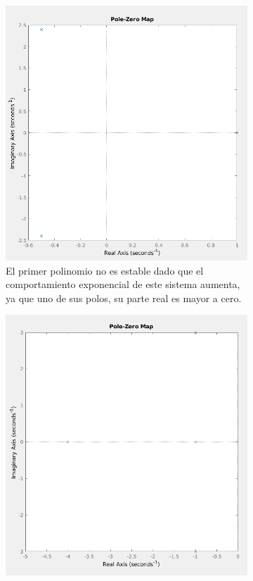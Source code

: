 \documentclass[12pt, letterpaper]{article}
\begin{document}
\begin{enumerate}
				\begin{figure}[H]
					\centering
					\begin{subfigure}[b]{0.49\linewidth}
						\includegraphics[width=\linewidth]{3a.png}
						\caption{El primer polinomio no es estable dado que el comportamiento exponencial de este sistema aumenta, ya que uno de sus polos, su parte real es mayor a cero.}
					\end{subfigure}
					\begin{subfigure}[b]{0.49\linewidth}
						\includegraphics[width=\linewidth]{3b.png}

\end{subfigure}
\end{figure}
\end{enumerate}
\end{document}
